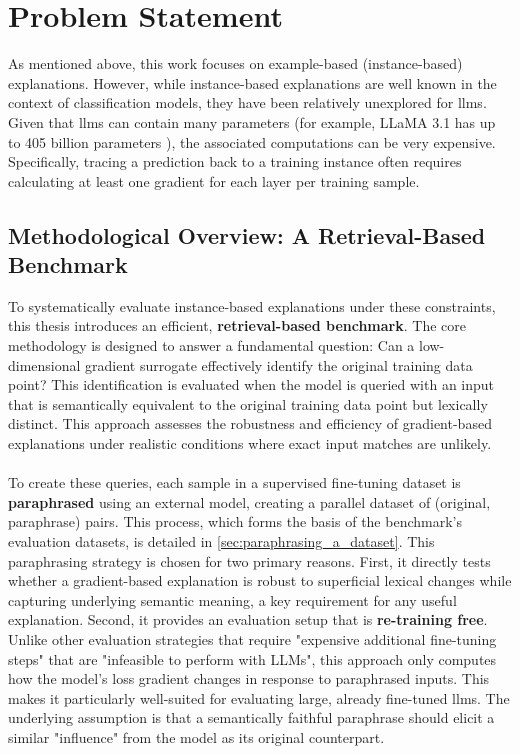 \section{Problem Statement} \label{sec:problem_statement}
As mentioned above, this work focuses on example-based (instance-based) explanations. However, while instance-based explanations are well known in the context of classification models, they have been relatively unexplored for \acrlong{llm}s. Given that \acrlong{llm}s can contain many parameters (for example, LLaMA 3.1 has up to 405 billion parameters \cite{meta_ai_llama_3_1}), the associated computations can be very expensive. Specifically, tracing a prediction back to a training instance often requires calculating at least one gradient for each layer per training sample.

\subsection{Methodological Overview: A Retrieval-Based Benchmark}\label{subsec:methodological_overview}
To systematically evaluate instance-based explanations under these constraints, this thesis introduces an efficient, \textbf{retrieval-based benchmark}. The core methodology is designed to answer a fundamental question: Can a low-dimensional gradient surrogate effectively identify the original training data point? This identification is evaluated when the model is queried with an input that is semantically equivalent to the original training data point but lexically distinct. This approach assesses the robustness and efficiency of gradient-based explanations under realistic conditions where exact input matches are unlikely.
\\\\
To create these queries, each sample in a supervised fine-tuning dataset is \textbf{paraphrased} using an external model, creating a parallel dataset of (original, paraphrase) pairs. This process, which forms the basis of the benchmark's evaluation datasets, is detailed in \autoref{sec:paraphrasing_a_dataset}. This paraphrasing strategy is chosen for two primary reasons. First, it directly tests whether a gradient-based explanation is robust to superficial lexical changes while capturing underlying semantic meaning, a key requirement for any useful explanation. Second, it provides an evaluation setup that is \textbf{re-training free}. Unlike other evaluation strategies that require "expensive additional fine-tuning steps" \cite{DBLP:conf/emnlp/AkyurekBLXTAG22} that are "infeasible to perform with LLMs", this approach only computes how the model's loss gradient changes in response to paraphrased inputs. This makes it particularly well-suited for evaluating large, already fine-tuned \acrshort{llm}s. The underlying assumption is that a semantically faithful paraphrase should elicit a similar "influence" from the model as its original counterpart.
